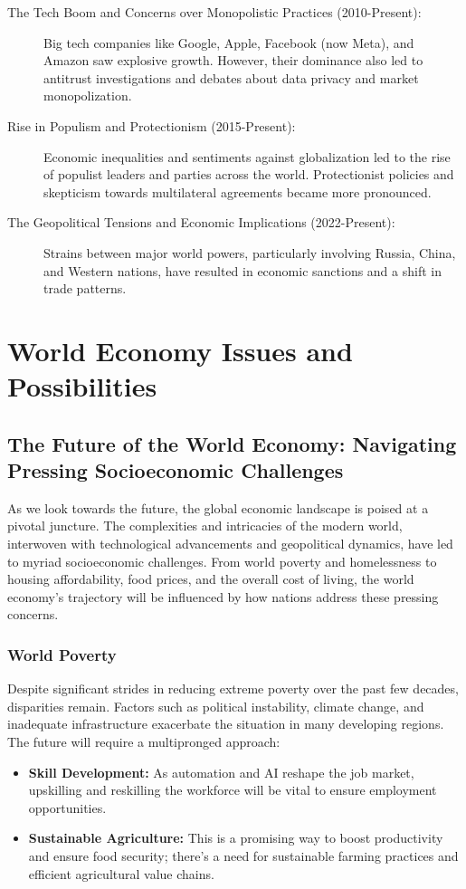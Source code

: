 \begin{description}
    \item[The Tech Boom and Concerns over Monopolistic Practices (2010-Present):] Big tech companies like Google, Apple, Facebook (now Meta), and Amazon saw explosive growth. However, their dominance also led to antitrust investigations and debates about data privacy and market monopolization.
    \item[Rise in Populism and Protectionism (2015-Present):] Economic inequalities and sentiments against globalization led to the rise of populist leaders and parties across the world. Protectionist policies and skepticism towards multilateral agreements became more pronounced.
    \item[The Geopolitical Tensions and Economic Implications (2022-Present):] Strains between major world powers, particularly involving Russia, China, and Western nations, have resulted in economic sanctions and a shift in trade patterns.
\end{description}

\section*{World Economy Issues and Possibilities}

\subsection*{The Future of the World Economy: Navigating Pressing Socioeconomic Challenges}

As we look towards the future, the global economic landscape is poised at a pivotal juncture. The complexities and intricacies of the modern world, interwoven with technological advancements and geopolitical dynamics, have led to myriad socioeconomic challenges. From world poverty and homelessness to housing affordability, food prices, and the overall cost of living, the world economy's trajectory will be influenced by how nations address these pressing concerns.

\subsubsection*{World Poverty}
Despite significant strides in reducing extreme poverty over the past few decades, disparities remain. Factors such as political instability, climate change, and inadequate infrastructure exacerbate the situation in many developing regions. The future will require a multipronged approach:
\begin{itemize}
    \item \textbf{Skill Development:} As automation and AI reshape the job market, upskilling and reskilling the workforce will be vital to ensure employment opportunities.
    \item \textbf{Sustainable Agriculture:} This is a promising way to boost productivity and ensure food security; there's a need for sustainable farming practices and efficient agricultural value chains.
\end{itemize}

